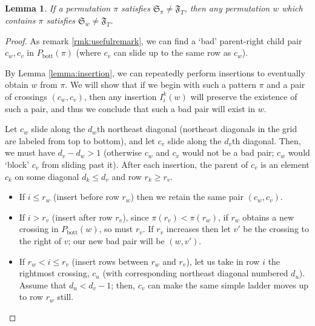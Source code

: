 \documentclass{article}
\newtheorem{lemma}[theorem]{Lemma}
\theoremstyle{definition} %
\newtheorem{definition}[theorem]{Definition}
\newcommand{\Dora}[1]{{\color{red} \sf $\clubsuit$ Dora: [#1]}}
\begin{document}
\vspace{1em}
\begin{lemma}\label{lemma:patterncontainment}
    If a permutation $\pi$ satisfies $\mathfrak{S}_\pi \neq \mathfrak{F}_T$, then any permutation $w$ which contains $\pi$ satisfies $\mathfrak{S}_w \neq \mathfrak{F}_T$.
\end{lemma}
\begin{proof}

As remark \ref{rmk:usefulremark}, we can find a `bad' parent-right child pair $c_w, c_v$ in $P_{\text{bott}}(\pi)$ (where $c_v$ can slide up to the same row as $c_w$). 


    By Lemma \ref{lemma:insertion}, we can repeatedly perform insertions to eventually obtain $w$ from $\pi$. We will show that if we begin with such a pattern $\pi$ and a pair of crossings $(c_w,c_v)$, then any insertion $I_i^k(w)$ will preserve the existence of such a pair, and thus we conclude that such a bad pair will exist in $w$.
    
Let $c_w$ slide along the $d_w$th northeast diagonal (northeast diagonals in the grid are labeled from top to bottom), and let $c_v$ slide along the $d_v$th diagonal. Then, we must have $d_v-d_w>1$ (otherwise $c_w$ and $c_v$ would not be a bad pair; $c_w$ would `block' $c_v$ from sliding past it). After each insertion, the parent of $c_v$ is an element $c_k$ on some diagonal $d_k \le d_v$ and row $r_k \ge r_v$. 
    \begin{itemize}
        \item If $i\le r_w$ (insert before row $r_w$) then we retain the same pair $(c_w,c_v)$.
        \item If $i > r_v$ (insert after row $r_v$), since $\pi(r_v)<\pi(r_w)$,  if $r_w$ obtains a new crossing in $P_{\text{bott}}(w)$, so must $r_v$. If $r_v$ increases then let $v'$ be the crossing to the right of $v$; our new bad pair will be $(w,v')$. 
        
        \item If $r_w<i \le r_v$ (insert rows between $r_w$ and $r_v$), let us take in row $i$ the rightmost crossing, $c_u$ (with corresponding northeast diagonal numbered $d_u$). Assume that $d_u<d_v-1$; then, $c_v$ can make the same simple ladder moves up to row $r_w$ still. 
    \end{itemize}


\end{proof}
\end{document}
